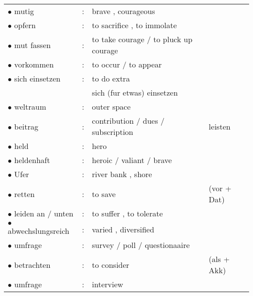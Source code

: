 \documentclass[a4paper,twocolumn,10pt]{article}
\begin{document}
\begin{tabularx}{0.95\linewidth}{lll|X}

\rowcolor{white} $\bullet$ mutig                 & : & brave , courageous                           & \\
\rowcolor{white} $\bullet$ opfern                & : & to sacrifice , to immolate                   & \\
\rowcolor{white} $\bullet$ mut fassen            & : & to take courage / to pluck up courage        & \\
\rowcolor{white} $\bullet$ vorkommen             & : & to occur / to appear                         & \\
\rowcolor{white} $\bullet$ sich einsetzen        & : & to do extra                                  & \\
\rowcolor{white}                                 &   & sich (fur etwas) einsetzen                   & \\
\rowcolor{white} $\bullet$ weltraum              & : & outer space                                  & \\
\rowcolor{white} $\bullet$ beitrag               & : & contribution / dues / subscription           & leisten \\
\rowcolor{white} $\bullet$ held                  & : & hero                                         & \\
\rowcolor{white} $\bullet$ heldenhaft            & : & heroic / valiant / brave                     & \\
\rowcolor{white} $\bullet$ Ufer                  & : & river bank , shore                           & \\
\rowcolor{white} $\bullet$ retten                & : & to save                                      & (vor + Dat) \\
\rowcolor{white} $\bullet$ leiden an / unten     & : & to suffer , to tolerate                      & \\
\rowcolor{white} $\bullet$ abwechslungsreich     & : & varied , diversified                         & \\
\rowcolor{white} $\bullet$ umfrage               & : & survey / poll / questionaaire                & \\
\rowcolor{white} $\bullet$ betrachten            & : & to consider                                  & (als + Akk)\\
\rowcolor{white} $\bullet$ umfrage               & : & interview                                    & \\

\end{tabularx}
\end{document}
